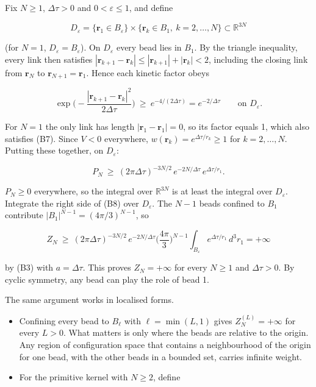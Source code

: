 \documentclass[11pt,a4paper]{article}
\newcommand{\tagmark}[1]{\marginnote{\scriptsize\ttfamily #1}}
\providecommand{\tightlist}{\setlength{\itemsep}{0pt}\setlength{\parskip}{0pt}}
\begin{document}
\tagmark{[D]} Fix \(N\ge1\), \(\Delta\tau>0\) and \(0<\varepsilon\le1\), and define

\[
D_\varepsilon=\{\mathbf r_1\in B_\varepsilon\}\times\{\mathbf r_k\in B_1,\ k=2,\dots,N\}\subset\mathbb R^{3N}
\]

(for \(N=1\), \(D_\varepsilon=B_\varepsilon\)). On \(D_\varepsilon\) every bead lies in \(B_1\). By the triangle inequality, every link then satisfies \(|\mathbf r_{k+1}-\mathbf r_k|\le|\mathbf r_{k+1}|+|\mathbf r_k|<2\), including the closing link from \(\mathbf r_N\) to \(\mathbf r_{N+1}=\mathbf r_1\). Hence each kinetic factor obeys

\begin{equation}
\exp\Big(-\frac{|\mathbf r_{k+1}-\mathbf r_k|^2}{2\Delta\tau}\Big)\ \ge\ e^{-4/(2\Delta\tau)}=e^{-2/\Delta\tau}\qquad\text{on }D_\varepsilon.\tag{B7}
\end{equation}

For \(N=1\) the only link has length \(|\mathbf r_1-\mathbf r_1|=0\), so its factor equals 1, which also satisfies (B7). Since \(V<0\) everywhere, \(w(\mathbf r_k)=e^{\Delta\tau/r_k}\ge1\) for \(k=2,\dots,N\). Putting these together, on \(D_\varepsilon\):

\begin{equation}
P_N\ \ge\ (2\pi\Delta\tau)^{-3N/2}\,e^{-2N/\Delta\tau}\,e^{\Delta\tau/r_1}.\tag{B8}
\end{equation}

\(P_N\ge0\) everywhere, so the integral over \(\mathbb R^{3N}\) is at least the integral over \(D_\varepsilon\). Integrate the right side of (B8) over \(D_\varepsilon\). The \(N-1\) beads confined to \(B_1\) contribute \(|B_1|^{N-1}=(4\pi/3)^{N-1}\), so

\begin{equation}
Z_N\ \ge\ (2\pi\Delta\tau)^{-3N/2}\,e^{-2N/\Delta\tau}\Big(\frac{4\pi}{3}\Big)^{N-1}\int_{B_\varepsilon}e^{\Delta\tau/r_1}\,d^3r_1=+\infty\tag{B9}
\end{equation}

by (B3) with \(a=\Delta\tau\). This proves \(Z_N=+\infty\) for every \(N\ge1\) and \(\Delta\tau>0\). By cyclic symmetry, any bead can play the role of bead 1.

\tagmark{[D]} The same argument works in localised forms.

\begin{itemize}
\tightlist
\item
  Confining every bead to \(B_\ell\) with \(\ell=\min(L,1)\) gives \(Z_N^{(L)}=+\infty\) for every \(L>0\). What matters is only where the beads are relative to the origin. Any region of configuration space that contains a neighbourhood of the origin for one bead, with the other beads in a bounded set, carries infinite weight.
\item
  For the primitive kernel with \(N\ge2\), define
\end{itemize}
\end{document}
